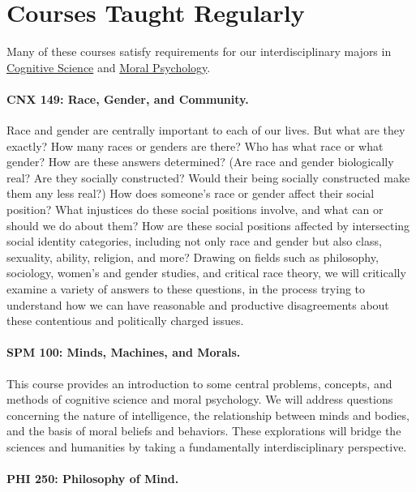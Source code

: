 \documentclass[11pt]{article}
\begin{document}
\section[Courses]{Courses Taught Regularly}

Many of these courses satisfy requirements for our interdisciplinary majors in \href{https://www.fandm.edu/fields-of-study/cognitive-science/index.html}{Cognitive Science} and \href{https://www.fandm.edu/fields-of-study/moral-psychology/index.html}{Moral Psychology}.
\medskip{}

\paragraph{CNX 149: Race, Gender, and Community.}

Race and gender are centrally important to each of our lives. But what are they exactly? How many races or genders are there? Who has what race or what gender? How are these answers determined? (Are race and gender biologically real? Are they socially constructed? Would their being socially constructed make them any less real?) How does someone's race or gender affect their social position? What injustices do these social positions involve, and what can or should we do about them? How are these social positions affected by intersecting social identity categories, including not only race and gender but also class, sexuality, ability, religion, and more? Drawing on fields such as philosophy, sociology, women's and gender studies, and critical race theory, we will critically examine a variety of answers to these questions, in the process trying to understand how we can have reasonable and productive disagreements about these contentious and politically charged issues.

\paragraph{SPM 100: Minds, Machines, and Morals.}

This course provides an introduction to some central problems, concepts, and methods of cognitive science and moral psychology. We will address questions concerning the nature of intelligence, the relationship between minds and bodies, and the basis of moral beliefs and behaviors. These explorations will bridge the sciences and humanities by taking a fundamentally interdisciplinary perspective.

\paragraph{PHI 250: Philosophy of Mind.}
\end{document}
